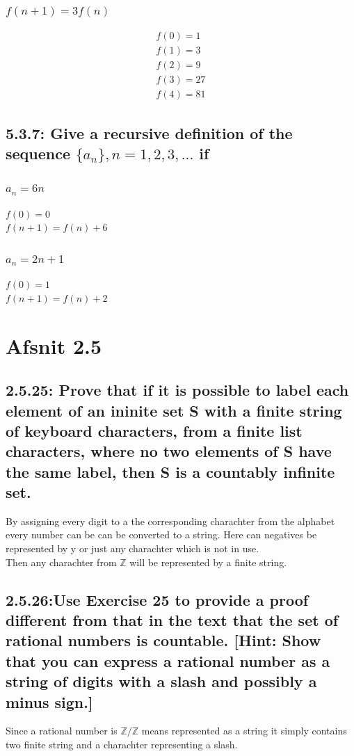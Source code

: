 \documentclass[12pt, a4paper]{report}
\begin{document}
					\subsubsection{$f(n+1)=3f(n)$}
						\begin{align*}
							f(0)=1\\
							f(1)=3\\
							f(2)=9\\
							f(3)=27\\
							f(4)=81
						\end{align*}
				\setcounter{subsection}{6}
				\subsection{5.3.7: Give a recursive definition of the sequence $\{a_n\},n=1,2,3,...$ if }
					\subsubsection{$a_n=6n$}
						$f(0)=0$\\
						$f(n+1)=f(n)+6$
					\subsubsection{$a_n=2n+1$}
						$f(0)=1$\\
						$f(n+1)=f(n)+2$
			\section{Afsnit 2.5}
				\setcounter{subsection}{24}
				\subsection{2.5.25: Prove that if it is possible to label each element of an ininite set S with a ﬁnite string of keyboard characters, from a ﬁnite list characters, where no two elements of S have the same label, then S is a countably inﬁnite set.}
					By assigning every digit to a the corresponding charachter from the alphabet every number can be can be converted to a string. Here can negatives be represented by y or just any charachter which is not in use. \\
					Then any charachter from $\mathbb{Z}$ will be represented by a finite string.\\
				\subsection{2.5.26:Use Exercise 25 to provide a proof diﬀerent from that in the text that the set of rational numbers is countable. [Hint: Show that you can express a rational number as a string of digits with a slash and possibly a minus sign.]}
					Since a rational number is $\mathbb{Z}/\mathbb{Z}$ means represented as a string it simply contains two finite string and a charachter representing a slash.
\end{document}
